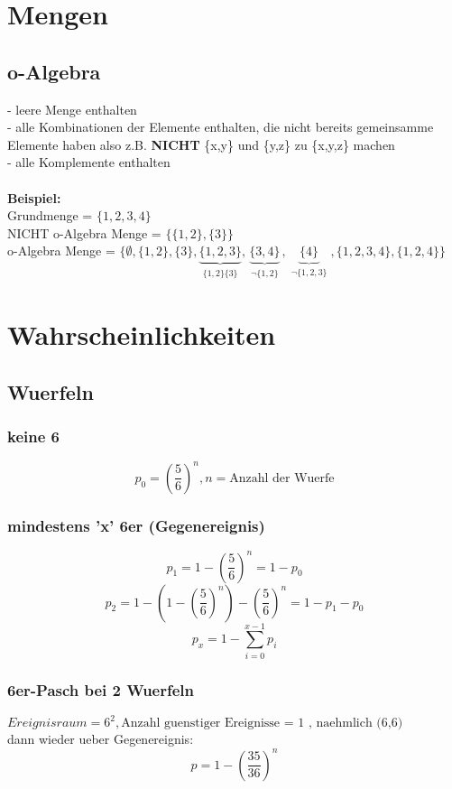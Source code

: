 \documentclass{article}
\begin{document}
	\section{Mengen}
	\subsection{o-Algebra}
	- leere Menge enthalten\\
	- alle Kombinationen der Elemente enthalten, die nicht bereits gemeinsamme Elemente haben also z.B. \textbf{NICHT} \{x,y\} und \{y,z\} zu \{x,y,z\} machen\\
	- alle Komplemente enthalten\\ \\
	\textbf{Beispiel:}\\
		Grundmenge = $\{1,2,3,4\}$\\
		NICHT o-Algebra Menge = $\{\{1,2\},\{3\}\}$\\
		o-Algebra Menge = $\{\emptyset ,\{1,2\},\{3\},
		\underbrace{\{1,2,3\}}_{\substack{\{1,2\}\{3\}}},
		\underbrace{\{3,4\}}_{\substack{\neg \{1,2\}}},
		\underbrace{\{4\}}_{\substack{\neg \{1,2,3\}}},
		\{1,2,3,4\},\{1,2,4\}\}$
	
	\section{Wahrscheinlichkeiten}
	\subsection{Wuerfeln}
	\subsubsection{keine 6}
		\[
			p_0 = \left( \frac{5}{6} \right)^n , n = \text{Anzahl der Wuerfe}
		\]
	\subsubsection{mindestens 'x' 6er (Gegenereignis)}
		\[	
			p_1 = 1 - \left( \frac{5}{6} \right)^n = 1 - p_0
		\]	
		\[		
			p_2 = 1-\left(1 - \left( \frac{5}{6} \right)^n\right)-\left( \frac{5}{6} \right)^n = 1-p_1 -p_0
		\]
		\[
			p_x = 1 - \sum_{i=0}^{x-1} p_i
		\]
	\subsubsection{6er-Pasch bei 2 Wuerfeln}
		$Ereignisraum = 6^2 , \text{Anzahl guenstiger Ereignisse = 1 , naehmlich (6,6)}$\\
		dann wieder ueber Gegenereignis: \\
		\[ p=1-\left(\frac{35}{36}\right)^n \]
\end{document}
